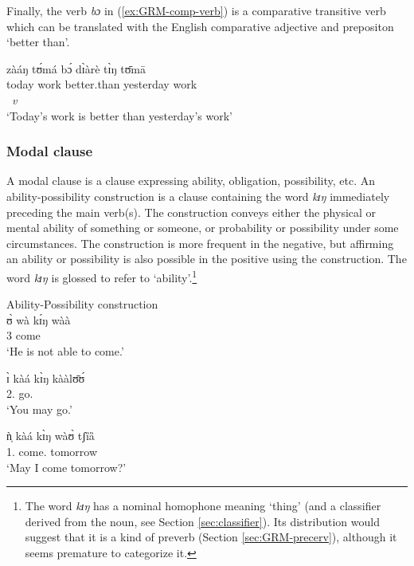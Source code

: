 Finally,  the verb {\it bɔ} in (\ref{ex:GRM-comp-verb}) is a comparative
transitive verb which can be translated with the English comparative adjective
and prepositon `better than'.


\ea\label{ex:GRM-comp-verb}
\glll zàáŋ tʊ́má bɔ́ dɪ̀àrè tɪ̀ŋ tʊ̄mā \\
today work better.than yesterday {\art} work\\
{}  {}  {\it v} {} {}   {}\\
\glt `Today's work is better than yesterday's work'
\z


\subsubsection{Modal clause}
\label{sec:GRM-compar-ct}

A modal clause is a clause expressing  ability, obligation, possibility, etc. An
ability-possibility construction is a clause containing the word {\it kɪŋ} 
immediately preceding the main verb(s).  The construction conveys either
the
physical or mental
ability of something or someone, or    probability or possibility under some
circumstances. The construction is more frequent in the negative, but affirming
an ability or possibility is also possible in the positive using the
construction. The word {\it kɪŋ} is glossed  {\abl} to refer to
`ability'.\footnote{The word {\it kɪŋ} has a  nominal homophone meaning 
`thing' (and a classifier derived from the noun, see Section
\ref{sec:classifier}).  Its distribution would suggest that it is a kind of 
preverb (Section \ref{sec:GRM-precerv}), although it seems premature to
categorize it.}

\ea
\label{ex:}
{\upshape Ability-Possibility construction}\\

\ea
\label{ex:GRM-modal-12.2}
\gll ʊ̀ wà kɪ́ŋ wàà\\
{3\sg} {\neg} {\abl} come\\
\glt  `He is not able to come.'

\ex  
\gll ɪ̀ kàá kɪ̀ŋ kààlʊ̄ʊ́\\
 {2.\sg} {\fut} {\abl} go.{\foc} \\
\glt  `You may go.'

\ex\label{ex:GRM-modal-13.1}
\gll ǹ̩ kàá kɪ̀ŋ wàʊ̀ tʃȉȁ\\
 {1.\sg}  {\fut} {\abl} come.{\foc} tomorrow\\
\glt `May I come tomorrow?'

\z
\z



